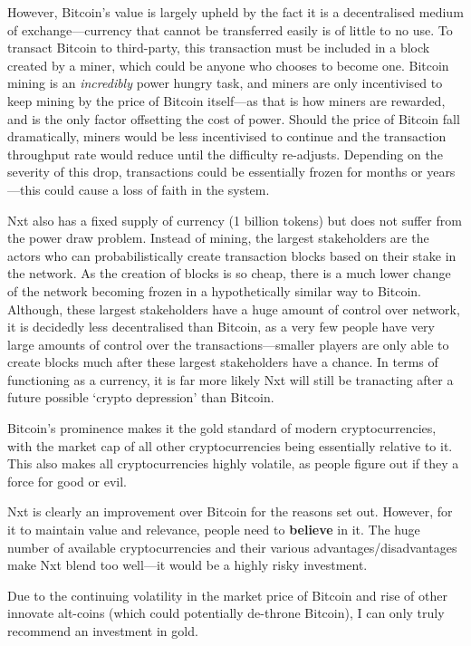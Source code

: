 \documentclass[11pt]{article}
\begin{document}
However, Bitcoin's value is largely upheld by the fact it is a decentralised medium of exchange---currency that cannot be transferred easily is of little to no use. To transact Bitcoin to third-party, this transaction must be included in a block created by a miner, which could be anyone who chooses to become one. Bitcoin mining is an \textit{incredibly} power hungry task, and miners are only incentivised to keep mining by the price of Bitcoin itself---as that is how miners are rewarded, and is the only factor offsetting the cost of power. Should the price of Bitcoin fall dramatically, miners would be less incentivised to continue and the transaction throughput rate would reduce until the difficulty re-adjusts. Depending on the severity of this drop, transactions could be essentially frozen for months or years---this could cause a loss of faith in the system.

Nxt also has a fixed supply of currency (1 billion tokens) but does not suffer from the power draw problem. Instead of mining, the largest stakeholders are the actors who can probabilistically create transaction blocks based on their stake in the network. As the creation of blocks is so cheap, there is a much lower change of the network becoming frozen in a hypothetically similar way to Bitcoin. Although, these largest stakeholders have a huge amount of control over network, it is decidedly less decentralised than Bitcoin, as a very few people have very large amounts of control over the transactions---smaller players are only able to create blocks much after these largest stakeholders have a chance. In terms of functioning as a currency, it is far more likely Nxt will still be tranacting after a future possible `crypto depression' than Bitcoin.

Bitcoin's prominence makes it the gold standard of modern cryptocurrencies, with the market cap of all other cryptocurrencies being essentially relative to it. This also makes all cryptocurrencies highly volatile, as people figure out if they a force for good or evil.

Nxt is clearly an improvement over Bitcoin for the reasons set out. However, for it to maintain value and relevance, people need to \textbf{believe} in it. The huge number of available cryptocurrencies and their various advantages/disadvantages make Nxt blend too well---it would be a highly risky investment.

Due to the continuing volatility in the market price of Bitcoin and rise of other innovate alt-coins (which could potentially de-throne Bitcoin), I can only truly recommend an investment in gold. 
\end{document}
